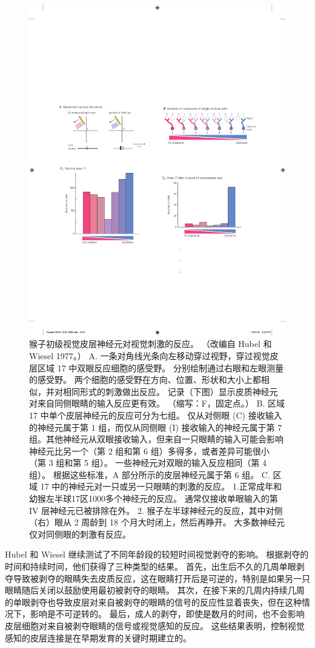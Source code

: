 \begin{figure}[htbp]
	\centering
	\includegraphics[width=0.5\linewidth]{chap49/fig_49_3}
	\caption{猴子初级视觉皮层神经元对视觉刺激的反应。 （改编自 Hubel 和 Wiesel 1977。） A. 一条对角线光条向左移动穿过视野，穿过视觉皮层区域 17 中双眼反应细胞的感受野。 分别绘制通过右眼和左眼测量的感受野。 两个细胞的感受野在方向、位置、形状和大小上都相似，并对相同形式的刺激做出反应。 记录（下图）显示皮质神经元对来自同侧眼睛的输入反应更有效。 （缩写：F，固定点。） B. 区域 17 中单个皮层神经元的反应可分为七组。 仅从对侧眼 (C) 接收输入的神经元属于第 1 组，而仅从同侧眼 (I) 接收输入的神经元属于第 7 组。其他神经元从双眼接收输入，但来自一只眼睛的输入可能会影响 神经元比另一个（第 2 组和第 6 组）多得多，或者差异可能很小（第 3 组和第 5 组）。 一些神经元对双眼的输入反应相同（第 4 组）。 根据这些标准，A 部分所示的皮层神经元属于第 6 组。 C. 区域 17 中的神经元对一只或另一只眼睛的刺激的反应。 1.正常成年和幼猴左半球17区1000多个神经元的反应。 通常仅接收单眼输入的第 IV 层神经元已被排除在外。 2. 猴子左半球神经元的反应，其中对侧（右）眼从 2 周龄到 18 个月大时闭上，然后再睁开。 大多数神经元仅对同侧眼的刺激有反应。}
	\label{fig:49_3}
\end{figure}


Hubel 和 Wiesel 继续测试了不同年龄段的较短时间视觉剥夺的影响。
根据剥夺的时间和持续时间，他们获得了三种类型的结果。
首先，出生后不久的几周单眼剥夺导致被剥夺的眼睛失去皮质反应，这在眼睛打开后是可逆的，特别是如果另一只眼睛随后关闭以鼓励使用最初被剥夺的眼睛。
其次，在接下来的几周内持续几周的单眼剥夺也导致皮层对来自被剥夺的眼睛的信号的反应性显着丧失，但在这种情况下，影响是不可逆转的。
最后，成人的剥夺，即使是数月的时间，也不会影响皮层细胞对来自被剥夺眼睛的信号或视觉感知的反应。
这些结果表明，控制视觉感知的皮层连接是在早期发育的关键时期建立的。


